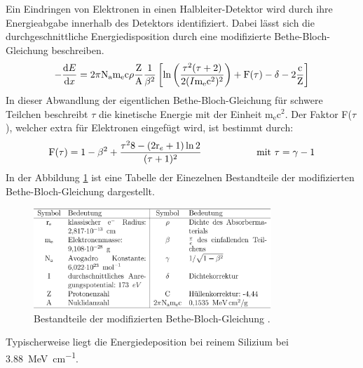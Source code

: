 Ein Eindringen von Elektronen in einen Halbleiter-Detektor wird durch
ihre Energieabgabe innerhalb des Detektors identifiziert. Dabei lässt sich die
durchgeschnittliche Energiedisposition durch eine modifizierte Bethe-Bloch-Gleichung
beschreiben.
\begin{equation}
  -\frac{\text{d}E}{\text{d}x} = 2\pi \text{N}_\text{a} \text{m}_\text{e} \text{c}\rho \frac{\text{Z}}{\text{A}}\frac{1}{\beta^2}\left[\text{ln}\left(\frac{\tau^2(\tau + 2)}{2(I\/\text{m}_\text{e}\text{c}^2)^2}\right) + \text{F}(\tau) - \delta - 2\frac{\text{c}}{\text{Z}}\right]
\end{equation}
In dieser Abwandlung der eigentlichen Bethe-Bloch-Gleichung für schwere Teilchen
beschreibt $\tau$ die kinetische Energie mit der Einheit m$_\text{e}$c$^2$. Der
Faktor F($\tau$), welcher extra für Elektronen eingefügt wird, ist bestimmt durch:
\begin{equation}
  \text{F}(\tau) = 1 - \beta^2 + \frac{\tau^2\/8 - (2\text{r}_e + 1) \ln2}{(\tau + 1)^2} \hspace{2cm}\text{mit } \tau = \gamma - 1
\end{equation}
In der Abbildung \ref{fig:tab} ist eine Tabelle der Einezelnen Bestandteile der
modifizierten Bethe-Bloch-Gleichung dargestellt.
\begin{figure}[htb]
  \centering
  \includegraphics[width=0.8\textwidth]{images/Tabelle.png}
  \caption{Bestandteile der modifizierten Bethe-Bloch-Gleichung \cite{anleitung}.}
  \label{fig:tab}
\end{figure}
\FloatBarrier
Typischerweise liegt die Energiedeposition bei reinem Silizium bei
\SI{3.88}{\mega\electronvolt\per\centi\meter}.

